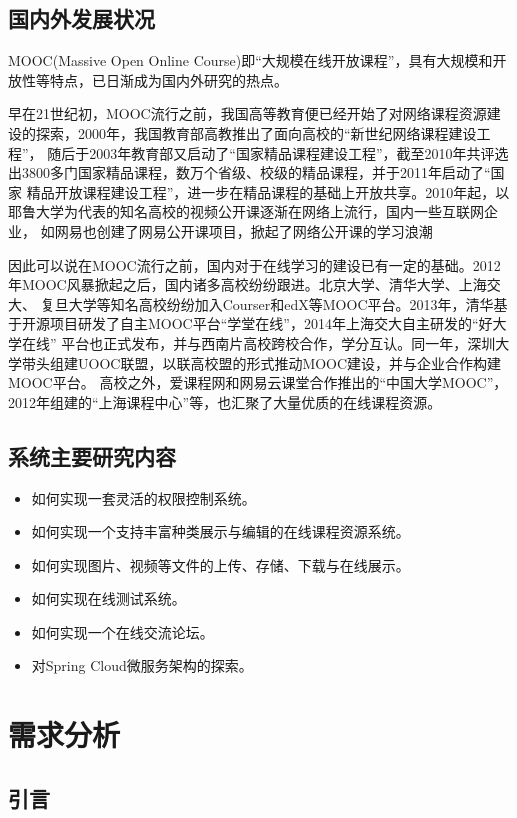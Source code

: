 \documentclass[titlepage,UTF8,linespread=1.5]{ctexart}
\begin{document}
\subsection{国内外发展状况}
MOOC(Massive Open Online Course)即“大规模在线开放课程”，具有大规模和开放性等特点，已日渐成为国内外研究的热点。\par
早在21世纪初，MOOC流行之前，我国高等教育便已经开始了对网络课程资源建设的探索，2000年，我国教育部高教推出了面向高校的“新世纪网络课程建设工程”，
随后于2003年教育部又启动了“国家精品课程建设工程”，截至2010年共评选出3800多门国家精品课程，数万个省级、校级的精品课程，并于2011年启动了“国家
精品开放课程建设工程”，进一步在精品课程的基础上开放共享。2010年起，以耶鲁大学为代表的知名高校的视频公开课逐渐在网络上流行，国内一些互联网企业，
如网易也创建了网易公开课项目，掀起了网络公开课的学习浪潮\par
因此可以说在MOOC流行之前，国内对于在线学习的建设已有一定的基础。2012年MOOC风暴掀起之后，国内诸多高校纷纷跟进。北京大学、清华大学、上海交大、
复旦大学等知名高校纷纷加入Courser和edX等MOOC平台。2013年，清华基于开源项目研发了自主MOOC平台“学堂在线”，2014年上海交大自主研发的“好大学在线”
平台也正式发布，并与西南片高校跨校合作，学分互认。同一年，深圳大学带头组建UOOC联盟，以联高校盟的形式推动MOOC建设，并与企业合作构建MOOC平台。
高校之外，爱课程网和网易云课堂合作推出的“中国大学MOOC”，2012年组建的“上海课程中心”等，也汇聚了大量优质的在线课程资源。
\cite{mooc}\par
\subsection{系统主要研究内容}
\begin{itemize}
    \item 如何实现一套灵活的权限控制系统。
    \item 如何实现一个支持丰富种类展示与编辑的在线课程资源系统。
    \item 如何实现图片、视频等文件的上传、存储、下载与在线展示。
    \item 如何实现在线测试系统。
    \item 如何实现一个在线交流论坛。
    \item 对Spring Cloud微服务架构的探索。
\end{itemize}
\clearpage

\section{需求分析}
\subsection{引言}
\end{document}

